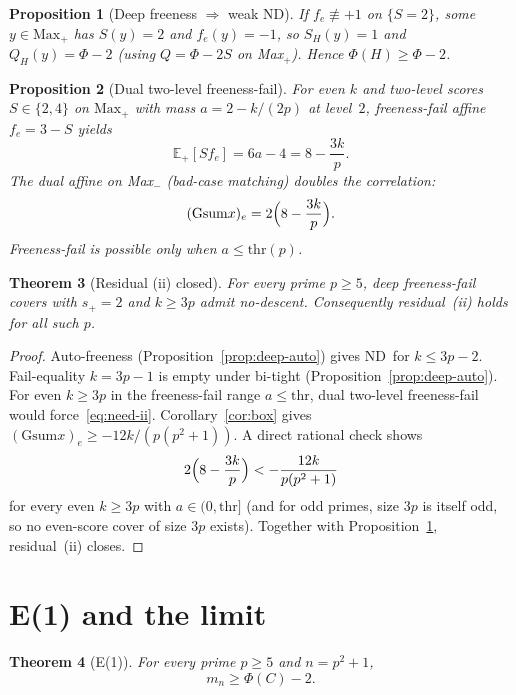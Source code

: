 \documentclass[11pt,a4paper]{article}
\theoremstyle{plain}
\newtheorem{theorem}{Theorem}[section]
\newtheorem{proposition}[theorem]{Proposition}
\theoremstyle{definition}
\newcommand{\Maxp}{\mathrm{Max}_{+}}
\newcommand{\Gsum}{\mathrm{Gsum}}
\newcommand{\thr}{\mathrm{thr}}
\newcommand{\ND}{\ensuremath{\mathrm{ND}}}
\newcommand{\ES}{\mathbb{E}}
\begin{document}
\begin{proposition}[Deep freeness $\Rightarrow$ weak \ND]
\label{prop:deep-free}
If $f_e\not\equiv+1$ on $\{S=2\}$, some $y\in\Maxp$ has $S(y)=2$ and $f_e(y)=-1$, so
$S_H(y)=1$ and $Q_H(y)=\Phi-2$ (using $Q=\Phi-2S$ on Max$_+$). Hence $\Phi(H)\ge\Phi-2$.
\end{proposition}

\begin{proposition}[Dual two-level freeness-fail]
\label{prop:dual-deep}
For even $k$ and two-level scores $S\in\{2,4\}$ on $\Maxp$ with mass
$a=2-k/(2p)$ at level~$2$, freeness-fail affine $f_e=3-S$ yields
\[
\ES_+[S f_e]=6a-4=8-\frac{3k}{p}.
\]
The dual affine on Max$_-$ (bad-case matching) doubles the correlation:
\begin{equation}
\label{eq:need-ii}
(\Gsum x)_e=2\Bigl(8-\frac{3k}{p}\Bigr).
\end{equation}
Freeness-fail is possible only when $a\le\thr(p)$.
\end{proposition}

\begin{theorem}[Residual (ii) closed]
\label{thm:res-ii}
For every prime $p\ge5$, deep freeness-fail covers with $s_+=2$ and $k\ge3p$ admit
no-descent. Consequently residual~(ii) holds for all such $p$.
\end{theorem}

\begin{proof}
Auto-freeness (Proposition~\ref{prop:deep-auto}) gives \ND\ for $k\le3p-2$.
Fail-equality $k=3p-1$ is empty under bi-tight (Proposition~\ref{prop:deep-auto}).
For even $k\ge3p$ in the freeness-fail range $a\le\thr$, dual two-level freeness-fail would
force~\eqref{eq:need-ii}.
Corollary~\ref{cor:box} gives $(\Gsum x)_e\ge -12k/(p(p^2+1))$.
A direct rational check shows
\[
2\Bigl(8-\frac{3k}{p}\Bigr)
< -\frac{12k}{p(p^2+1)}
\]
for every even $k\ge3p$ with $a\in(0,\thr]$ (and for odd primes, size $3p$ is itself odd, so
no even-score cover of size $3p$ exists).
Together with Proposition~\ref{prop:deep-free}, residual~(ii) closes.
\end{proof}

\section{E(1) and the limit}

\begin{theorem}[E(1)]
\label{thm:e1}
For every prime $p\ge5$ and $n=p^2+1$,
\[
m_n\ge\Phi(C)-2.
\]
\end{theorem}
\end{document}
